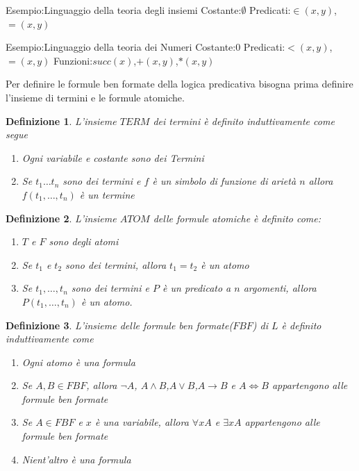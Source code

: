 \documentclass[a4paper]{report}
\newtheorem{defi}{Definizione}%
\begin{document}
Esempio:Linguaggio della teoria degli insiemi \newline
Costante:$\emptyset$\newline
Predicati:$\in(x,y)$, $=(x,y)$

Esempio:Linguaggio della teoria dei Numeri \newline
Costante:$0$ \newline
Predicati:$<(x,y)$,$=(x,y)$ \newline
Funzioni:$succ(x)$,$+(x,y)$,$*(x,y)$

Per definire le formule ben formate della logica predicativa bisogna prima definire
l'insieme di termini e le formule atomiche.
\begin{defi}
    L'insieme $TERM$ dei termini è definito induttivamente come segue
    \begin{enumerate}
        \item Ogni variabile e costante sono dei Termini
        \item Se $t_1 \dots t_n$ sono dei termini e $f$ è un simbolo di funzione di arietà $n$
              allora $f(t_1,\dots,t_n)$ è un termine
    \end{enumerate}
\end{defi}

\begin{defi}
    L'insieme $ATOM$ delle formule atomiche è definito come:
    \begin{enumerate}
        \item $T$ e $F$ sono degli atomi
        \item Se $t_1$ e $t_2$ sono dei termini, allora $t_1 = t_2$ è un atomo
        \item Se $t_1,\dots,t_n$ sono dei termini e $P$ è un predicato a $n$ argomenti,
              allora $P(t_1,\dots,t_n)$ è un atomo.
    \end{enumerate}
\end{defi}

\begin{defi}
    L'insieme delle formule ben formate($FBF$) di $L$ è definito induttivamente come
    \begin{enumerate}
        \item Ogni atomo è una formula
        \item Se $A,B \in FBF$, allora $\neg A$, $A \land B$,$A \lor B$,$A \rightarrow B$
              e $A \iff B$ appartengono alle formule ben formate
        \item Se $A \in FBF$ e $x$ è una variabile, allora $\forall x A$ e $\exists x A$
              appartengono alle formule ben formate
        \item Nient'altro è una formula
    \end{enumerate}
\end{defi}
\end{document}
